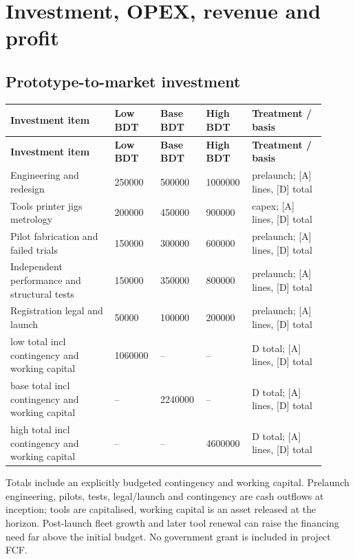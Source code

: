 \documentclass[11pt,a4paper]{article}
\begin{document}
\clearpage\section{Investment, OPEX, revenue and profit}
\subsection{Prototype-to-market investment}
{\small
\setlength{\tabcolsep}{3pt}\renewcommand{\arraystretch}{1.18}
\begin{longtable}{@{}>{\raggedright\arraybackslash}p{0.3161\linewidth}>{\raggedright\arraybackslash}p{0.1245\linewidth}>{\raggedright\arraybackslash}p{0.1245\linewidth}>{\raggedright\arraybackslash}p{0.1245\linewidth}>{\raggedright\arraybackslash}p{0.2203\linewidth}@{}}
\toprule \textbf{Investment item} & \textbf{Low BDT} & \textbf{Base BDT} & \textbf{High BDT} & \textbf{Treatment / basis} \\ \midrule
\endfirsthead\toprule \textbf{Investment item} & \textbf{Low BDT} & \textbf{Base BDT} & \textbf{High BDT} & \textbf{Treatment / basis} \\ \midrule
\endhead\bottomrule\endfoot
Engineering and redesign & \num{250000} & \num{500000} & \num{1000000} & prelaunch; [A] lines, [D] total \\
Tools printer jigs metrology & \num{200000} & \num{450000} & \num{900000} & capex; [A] lines, [D] total \\
Pilot fabrication and failed trials & \num{150000} & \num{300000} & \num{600000} & prelaunch; [A] lines, [D] total \\
Independent performance and structural tests & \num{150000} & \num{350000} & \num{800000} & prelaunch; [A] lines, [D] total \\
Registration legal and launch & \num{50000} & \num{100000} & \num{200000} & prelaunch; [A] lines, [D] total \\
low total incl contingency and working capital & \num{1060000} & -- & -- & D total; [A] lines, [D] total \\
base total incl contingency and working capital & -- & \num{2240000} & -- & D total; [A] lines, [D] total \\
high total incl contingency and working capital & -- & -- & \num{4600000} & D total; [A] lines, [D] total \\
\end{longtable}}
Totals include an explicitly budgeted contingency and working capital. Prelaunch engineering, pilots, tests, legal/launch and contingency are cash outflows at inception; tools are capitalised, working capital is an asset released at the horizon. Post-launch fleet growth and later tool renewal can raise the financing need far above the initial budget. No government grant is included in project FCF.
\end{document}
